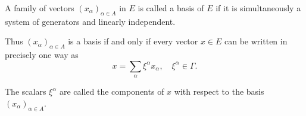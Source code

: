 A family of vectors $(x_\alpha)_{\alpha \in A}$ in $E$ is called a basis of $E$ if it is simultaneously a system of generators and linearly independent.

Thus $(x_\alpha)_{\alpha \in A}$ is a basis if and only if every vector $x \in E$ can be written in precisely one way as
$$x = \sum_\alpha \xi^\alpha x_\alpha, \quad \xi^\alpha \in \Gamma.$$

The scalars $\xi^\alpha$ are called the components of $x$ with respect to the basis $(x_\alpha)_{\alpha \in A}$.
